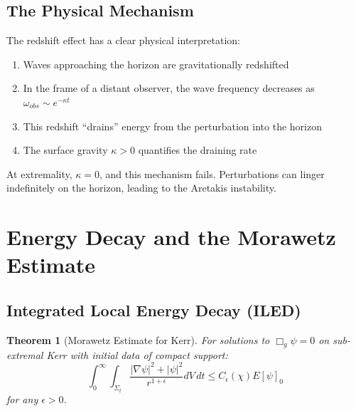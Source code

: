 \documentclass[12pt,a4paper]{article}
\newtheorem{theorem}{Theorem}[section]
\begin{document}
\subsection{The Physical Mechanism}

The redshift effect has a clear physical interpretation:
\begin{enumerate}
    \item Waves approaching the horizon are gravitationally redshifted
    \item In the frame of a distant observer, the wave frequency decreases as $\omega_{obs} \sim e^{-\kappa t}$
    \item This redshift ``drains'' energy from the perturbation into the horizon
    \item The surface gravity $\kappa > 0$ quantifies the draining rate
\end{enumerate}

At extremality, $\kappa = 0$, and this mechanism fails. Perturbations can linger indefinitely on the horizon, leading to the Aretakis instability.

\section{Energy Decay and the Morawetz Estimate}

\subsection{Integrated Local Energy Decay (ILED)}

\begin{theorem}[Morawetz Estimate for Kerr]\label{thm:morawetz}
For solutions to $\Box_g \psi = 0$ on sub-extremal Kerr with initial data of compact support:
\begin{equation}
\int_0^\infty \int_{\Sigma_t} \frac{|\nabla \psi|^2 + |\psi|^2}{r^{1+\epsilon}} dV\, dt \leq C_\epsilon(\chi) E[\psi]_0
\end{equation}
for any $\epsilon > 0$.
\end{theorem}
\end{document}
